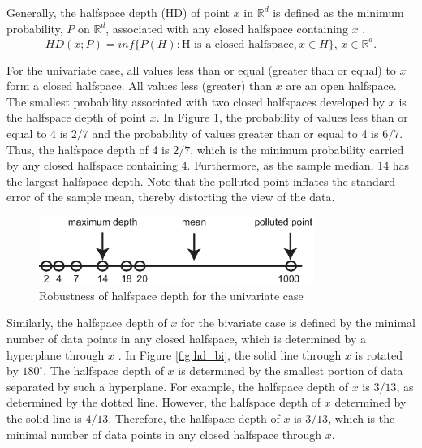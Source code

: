 \documentclass[a4paper,UKenglish]{lipics-v2018}
\begin{document}
Generally, the halfspace depth (HD) of point $x$ in $\mathbb{R}^d$ is defined as the minimum probability, $P$ on $\mathbb{R}^d$, associated with any closed halfspace containing $x$ \cite{liu00AS}. 
\begin{equation*}\label{eq:hd}
HD(x;P) = inf\{P(H): \text{H is a closed halfspace}, x \in H\}\text{, } x \in \mathbb{R}^d.
\end{equation*}

For the univariate case, all values less than or equal (greater than or equal) to $x$ form a closed halfspace.
All values less (greater) than $x$ are an open halfspace.
The smallest probability associated with two closed halfspaces developed by $x$ is the halfspace depth of point $x$.
In Figure \ref{fig:hd_uni}, the probability of values less than or equal to 4 is $2/7$ and the probability of values greater than or equal to 4 is $6/7$.
Thus, the halfspace depth of 4 is $2/7$, which is the minimum probability carried by any closed halfspace containing 4.
Furthermore, as the sample median, 14 has the largest halfspace depth.
Note that the polluted point inflates the standard error of the sample mean, thereby distorting the view of the data. 


\begin{figure}
	\centering
	\includegraphics[width=0.8\textwidth]{images/depth_uni.eps}
	\caption{Robustness of halfspace depth for the univariate case}
	\label{fig:hd_uni}	
\end{figure}

Similarly, the halfspace depth of $x$ for the bivariate case is defined by the minimal number of data points in any closed halfspace, which is determined by a hyperplane through $x$ \cite{rousseeuw96RSS}.
In Figure \ref{fig:hd_bi}, the solid line through $x$ is rotated by $180^{\circ}$.
The halfspace depth of $x$ is determined by the smallest portion of data separated by such a hyperplane. For example, the halfspace depth of $x$ is $3/13$, as determined by the dotted line.
However, the halfspace depth of $x$ determined by the solid line is  $4/13$.
Therefore, the halfspace depth of $x$ is $3/13$, which is the minimal number of data points in any closed halfspace through $x$.
 
\end{document}
